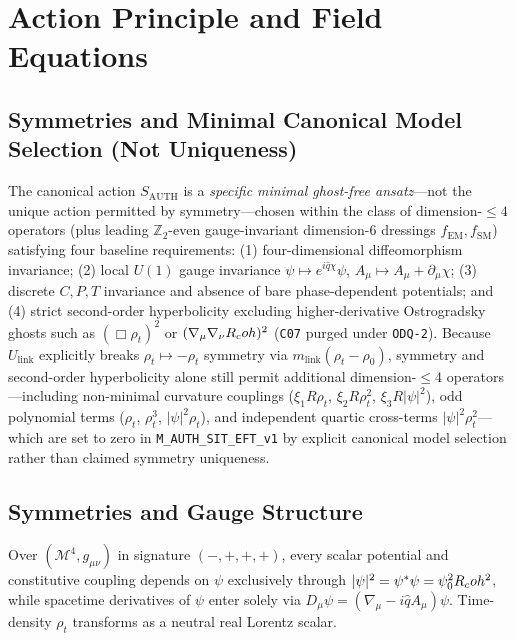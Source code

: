 \section{Action Principle and Field Equations}
\label{sec:action-principle}
\label{sec:core-action}

\subsection{Symmetries and Minimal Canonical Model Selection (Not Uniqueness)}

The canonical action $S_{\mathrm{AUTH}}$ is a \emph{specific minimal ghost-free ansatz}---not the unique action permitted by symmetry---chosen within the class of dimension-$\le 4$ operators (plus leading $\mathbb{Z}_2$-even gauge-invariant dimension-6 dressings $f_{\mathrm{EM}}, f_{\mathrm{SM}}$) satisfying four baseline requirements: (1) four-dimensional diffeomorphism invariance; (2) local $U(1)$ gauge invariance $\psi \mapsto e^{i\hat{q}\chi}\psi$, $A_\mu \mapsto A_\mu + \partial_\mu\chi$; (3) discrete $C, P, T$ invariance and absence of bare phase-dependent potentials; and (4) strict second-order hyperbolicity excluding higher-derivative Ostrogradsky ghosts such as $(\Box\rho_t)^2$ or $(\nabla_\mu\nabla_\nu R_coh)^2$ (\texttt{C07} purged under \texttt{ODQ-2}). Because $U_{\mathrm{link}}$ explicitly breaks $\rho_t \mapsto -\rho_t$ symmetry via $m_{\mathrm{link}}(\rho_t - \rho_0)$, symmetry and second-order hyperbolicity alone still permit additional dimension-$\le 4$ operators---including non-minimal curvature couplings ($\xi_1 R\rho_t$, $\xi_2 R\rho_t^2$, $\xi_3 R|\psi|^2$), odd polynomial terms ($\rho_t$, $\rho_t^3$, $|\psi|^2\rho_t$), and independent quartic cross-terms $|\psi|^2\rho_t^2$---which are set to zero in \texttt{M\_AUTH\_SIT\_EFT\_v1} by explicit canonical model selection rather than claimed symmetry uniqueness.

\subsection{Symmetries and Gauge Structure}

Over $(\mathcal{M}^4, g_{\mu\nu})$ in signature $(-,+,+,+)$, every scalar potential and constitutive coupling depends on $\psi$ exclusively through $|\psi|^2 = \psi^*\psi = \psi_0^2R_coh^2$, while spacetime derivatives of $\psi$ enter solely via $D_\mu\psi = (\nabla_\mu - i\hat{q}A_\mu)\psi$. Time-density $\rho_t$ transforms as a neutral real Lorentz scalar.

